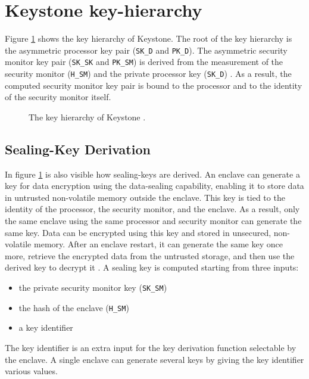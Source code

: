 \section{Keystone key-hierarchy}
Figure \ref{keystone-key-hierarchy} shows the key hierarchy of Keystone. The root of the key hierarchy is the asymmetric processor key pair (\texttt{SK\_D} and  \texttt{PK\_D}). The asymmetric security monitor key pair (\texttt{SK\_SK} and \texttt{PK\_SM}) is derived from the measurement of the security monitor (\texttt{H\_SM}) and the private processor key (\texttt{SK\_D}) \cite{keystone-doc}.
As a result, the computed security monitor key pair is bound to the processor and to the identity of the security monitor itself.

\begin{figure}[h!]
    \centering
    
    \caption{The key hierarchy of Keystone \cite{keystone-doc}.}
    \label{keystone-key-hierarchy}
\end{figure}
\subsection{Sealing-Key Derivation}
In figure \ref{keystone-key-hierarchy} is also visible how sealing-keys are derived. An enclave can generate a key for data encryption using the data-sealing capability, enabling it to store data in untrusted non-volatile memory outside the enclave. This key is tied to the identity of the processor, the security monitor, and the enclave. As a result, only the same enclave using the same processor and security monitor can generate the same key. Data can be encrypted using this key and stored in unsecured, non-volatile memory. After an enclave restart, it can generate the same key once more, retrieve the encrypted data from the untrusted storage, and then use the derived key to decrypt it \cite{keystone-doc}.
A sealing key is computed starting from three inputs:
\begin{itemize}
    \item the private security monitor key (\texttt{SK\_SM})
    \item the hash of the enclave (\texttt{H\_SM})
    \item a key identifier
\end{itemize}
The key identifier is an extra input for the key derivation function selectable by the enclave. A single enclave can generate several keys by giving the key identifier various values.


